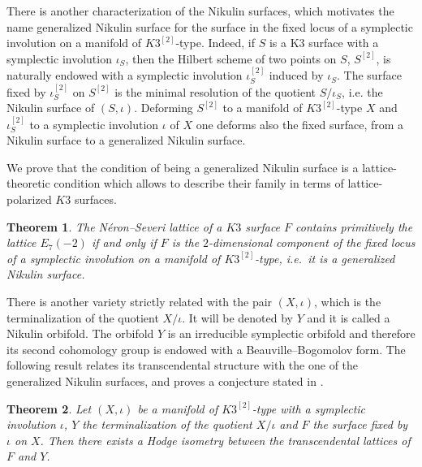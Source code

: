 \documentclass{amsart}
\newtheorem{thm}{Theorem}[section]
\theoremstyle{definition}
\numberwithin{equation}{section}
\numberwithin{equation}{section} \theoremstyle{definition}
\begin{document}
There is another characterization of the Nikulin surfaces, which motivates the name generalized Nikulin surface for the surface in the fixed locus of a symplectic involution on a manifold of $K3^{[2]}$-type. Indeed, if $S$ is a K3 surface with a symplectic involution $\iota_S$,  then the Hilbert scheme of two points on $S$, $S^{[2]}$, is naturally endowed with a symplectic involution $\iota_S^{[2]}$ induced by $\iota_S$. The surface fixed by $\iota_S^{[2]}$ on $S^{[2]}$ is the minimal resolution of the quotient $S/\iota_S$, i.e. the Nikulin surface of $(S,\iota)$. Deforming $S^{[2]}$ to a manifold of $K3^{[2]}$-type $X$ and $\iota_S^{[2]}$ to a symplectic involution $\iota$ of $X$ one deforms also the fixed surface, from a Nikulin surface to a generalized Nikulin surface.  

We prove that the condition of being a generalized Nikulin surface is a lattice-theoretic condition which allows to describe their family in terms of lattice-polarized $K3$ surfaces.
\begin{thm}\label{main}The N\'eron--Severi lattice of a $K3$ surface $F$ contains primitively the lattice $E_7(-2)$  if and only if $F$ is the $2$-dimensional component of the fixed locus of a symplectic involution on a  manifold of $K3^{[2]}$-type, i.e.~it is a generalized Nikulin surface.
\end{thm}

There is another variety strictly related with the pair $(X,\iota)$, which is the terminalization of the quotient $X/\iota$. It will be denoted by $Y$ and it is called a Nikulin orbifold. The orbifold $Y$ is an irreducible symplectic orbifold and therefore its second cohomology group is endowed with a Beauville--Bogomolov  form. The following result relates its transcendental structure with the one of the generalized Nikulin surfaces, and proves a conjecture stated in \cite[Conjecture 3.12]{CGKK}. 
\begin{thm}\label{main2} Let $(X,\iota)$ be a manifold of $K3^{[2]}$-type with a symplectic involution $\iota$, $Y$ the terminalization of the quotient $X/\iota$ and $F$ the surface fixed by $\iota$ on $X$. Then there exists a Hodge isometry between the transcendental lattices of $F$ and $Y$.
\end{thm}
\end{document}

